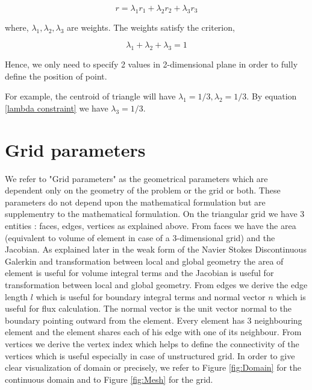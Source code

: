 \documentclass[a4paper,12pt]{book}
\begin{document}
\begin{equation}\label{barycentric point}
r = \lambda_1 r_1 + \lambda_2 r_2 + \lambda_3 r_3
\end{equation}

where, $\lambda_1, \lambda_2, \lambda_3$ are weights. The weights satisfy the criterion,

\begin{equation}\label{lambda constraint}
\lambda_1 + \lambda_2 + \lambda_3 = 1
\end{equation}

Hence, we only need to specify 2 values in 2-dimensional plane in order to fully define the position of point.

For example, the centroid of triangle will have $\lambda_1 = 1/3, \lambda_2 = 1/3$. By equation \eqref{lambda constraint} we have $\lambda_3=1/3$.

\section{Grid parameters}

We refer to "Grid parameters" as the geometrical parameters which are dependent only on the geometry of the problem or the grid or both. These parameters do not depend upon the mathematical formulation but are supplementry to the mathematical formulation. On the triangular grid we have 3 entities : faces, edges, vertices as explained above. From faces we have the area (equivalent to volume of element in case of a 3-dimensional grid) and the Jacobian. As explained later in the weak form of the Navier Stokes Discontinuous Galerkin and transformation between local and global geometry the area of element is useful for volume integral terms and the Jacobian is useful for transformation between local and global geometry. From edges we derive the edge length $l$ which is useful for boundary integral terms and normal vector $n$ which is useful for flux calculation. The normal vector is the unit vector normal to the boundary pointing outward from the element. Every element has 3 neighbouring element and the element shares each of his edge with one of its neighbour. From vertices we derive the vertex index which helps to define the connectivity of the vertices which is useful especially in case of unstructured grid. In order to give clear visualization of domain or precisely, we refer to Figure \ref{fig:Domain} for the continuous domain and to Figure \ref{fig:Mesh} for the grid.
\end{document}
